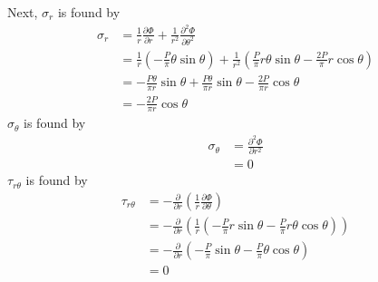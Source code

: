 Next, $\sigma_r$ is found by
\begin{align*}
    \sigma_r &= \frac{1}{r} \frac{\partial \Phi}{\partial r} + \frac{1}{r^2} \frac{\partial^2 \Phi}{\partial \theta^2} \\
    &= \frac{1}{r} \left(-\frac{P}{\pi} \theta \sin\theta \right) + \frac{1}{r^2} \left(\frac{P}{\pi}r \theta \sin\theta - \frac{2P}{\pi}r \cos\theta \right) \\
    &= -\frac{P\theta}{\pi r} \sin \theta + \frac{P\theta}{\pi r} \sin \theta - \frac{2P}{\pi r} \cos \theta \\ 
    &= \boxed{-\frac{2P}{\pi r} \cos \theta}
\end{align*}
$\sigma_\theta$ is found by
\begin{align*}
    \sigma_\theta &= \frac{\partial^2 \Phi}{\partial r^2} \\
    &= \boxed{0}
\end{align*}
$\tau_{r\theta}$ is found by
\begin{align*}
    \tau_{r\theta}& =  -\frac{\partial}{\partial r} \left( \frac{1}{r} \frac{\partial \Phi}{\partial \theta} \right) \\
    &= -\frac{\partial}{\partial r} \left( \frac{1}{r} \left(-\frac{P}{\pi} r \sin\theta - \frac{P}{\pi} r \theta \cos\theta \right) \right) \\
    &= -\frac{\partial}{\partial r} \left( -\frac{P}{\pi} \sin\theta - \frac{P}{\pi} \theta \cos\theta \right) \\
    &= \boxed{0}
\end{align*}